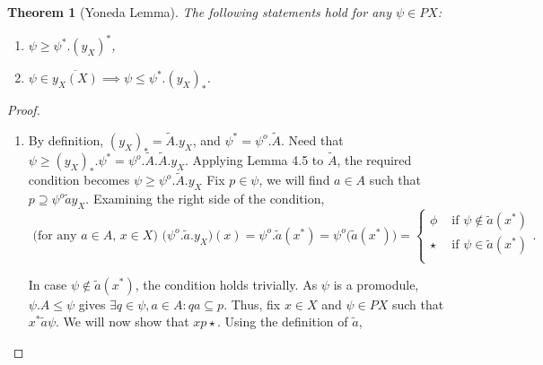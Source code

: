 \documentclass[a4paper]{article}
\newtheorem{theorem}{Theorem}[section]
\theoremstyle{definition}
\begin{document}
\begin{theorem}[Yoneda Lemma] %
	The following statements hold for any $\psi \in PX$:
	\begin{enumerate}[label=(\alph*)]
		\item $\psi \geq \psi^*.(y_X)^*$,
		\item $\psi \in \overline{y_X(X)} \implies \psi \leq \psi^*.(y_X)_*$.
	\end{enumerate}
\end{theorem}
\begin{proof}\setcounter{equation}{0}
	\begin{enumerate}[label=(\alph*)]
		\item By definition, $(y_X)_*=\tilde{A}.y_X$, and $\psi^*=\psi^o.\tilde{A}$. Need that
			$\psi \geq (y_X)_*.\psi^* = \psi^o.\tilde{A}.\tilde{A}.y_X$.
			Applying Lemma 4.5 to
			$\tilde{A}$, the required condition becomes $\psi \geq \psi^o .\tilde{A} .y_X$
			Fix $p \in \psi$,
			we will find $a \in A$ such that $p \supseteq \psi^o \tilde{a} y_X$. Examining the right side of the condition,
			\begin{equation}
				\text{ (for any $a \in A$, $x \in X$) } \Big(\psi^o.\tilde{a} .y_X \Big) (x) = \psi^o.\tilde{a} (x^*)=
				\psi^o\big(\tilde{a}(x^*)\big)= \begin{cases}
					\phi &\text{ if } \psi \notin \tilde{a} (x^*) \\
					\star &\text{ if } \psi \in \tilde{a} (x^*) \\

				\end{cases}.\end{equation}

				In case $\psi \notin \tilde{a} (x^*)$, the condition holds trivially. As $\psi$ is a
				promodule, $\psi.A\leq \psi$ gives $\exists q\in \psi, a
				\in A: qa \subseteq p$. Thus, fix $x\in X$ and	$\psi \in PX$ such that
				$x^* \tilde{a} \psi $. We will now show that $xp\star$. Using the definition of $\tilde{a}$,


\end{enumerate}
\end{proof}
\end{document}
